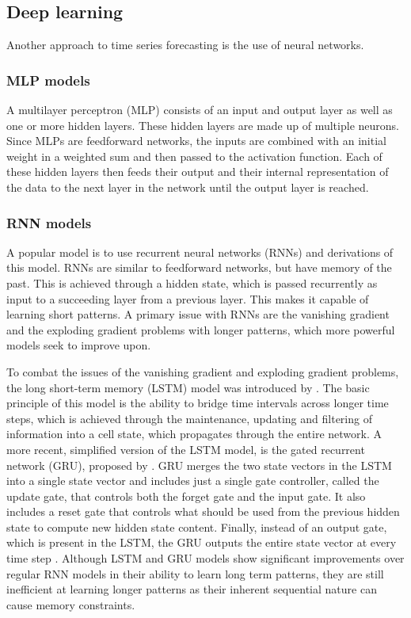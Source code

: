 \subsection{Deep learning}
Another approach to time series forecasting is the use of neural networks.
\subsubsection{MLP models}
A multilayer perceptron (MLP) consists of an input and output layer as well as one or more hidden layers. These hidden layers are made up of multiple neurons. 
Since MLPs are feedforward networks, the inputs are combined with an initial weight in a weighted sum and then passed to the activation function. 
Each of these hidden layers then feeds their output and their internal representation of the data to the next layer in the network until the output layer is reached.\cite{bentoMultilayerPerceptronExplained2021}

\subsubsection{RNN models} \label{subsec:RNNModels}
A popular model is to use recurrent neural networks (RNNs) and derivations of this model. RNNs are similar to feedforward networks, but have memory of the past. 
This is achieved through a hidden state, which is passed recurrently as input to a succeeding layer from a previous layer. This makes it capable of learning short patterns. 
A primary issue with RNNs are the vanishing gradient and the exploding gradient problems with longer patterns, which more powerful models seek to improve upon. \cite{AIModernApproach}\cite{hands-onML}

To combat the issues of the vanishing gradient and exploding gradient problems, the long short-term memory (LSTM) model was introduced by \citet{LSTMPaper}. The basic principle of this model is the ability to bridge time intervals across longer time steps, which is achieved through the maintenance, updating and filtering of information into a cell state, which propagates through the entire network\cite{LSTMPaper}. 
A more recent, simplified version of the LSTM model, is the gated recurrent network (GRU), proposed by \citet{GRU-paper}.
GRU merges the two state vectors in the LSTM into a single state vector and includes just a single gate controller, called the update gate, that controls both the forget gate and the input gate.
It also includes a reset gate that controls what should be used from the previous hidden state to compute new hidden state content.
Finally, instead of an output gate, which is present in the LSTM, the GRU outputs the entire state vector at every time step\cite{RNNPaper} \cite{hands-onML}.
Although LSTM and GRU models show significant improvements over regular RNN models in their ability to learn long term patterns, they are still inefficient at learning longer patterns as their inherent sequential nature can cause memory constraints\cite{AttentionIsAllYouNeed}. 